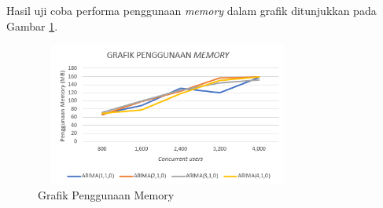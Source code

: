             Hasil uji coba performa penggunaan \textit{memory} dalam grafik ditunjukkan pada Gambar \ref{gmemoryusage}.
            
        	\begin{figure}[H]
				\centering
				\includegraphics[width=8.7cm,height=4.7cm]{Images/C-5/memoryusage.png}
				\caption{Grafik Penggunaan Memory}
				\label{gmemoryusage}
			\end{figure}
            
